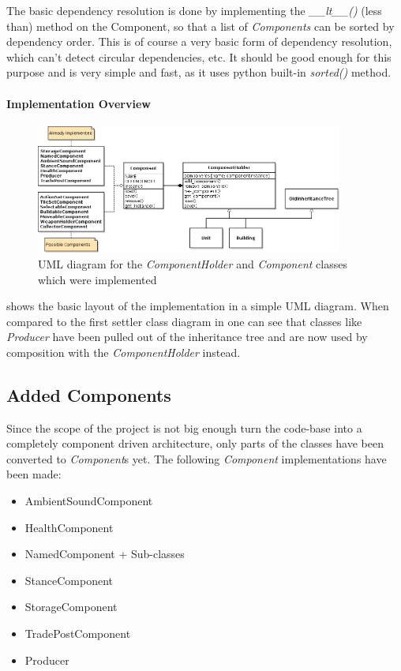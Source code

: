 The basic dependency resolution is done by implementing the \textit{\_\_lt\_\_()} (less than) method on the Component,
so that a list of \textit{Components} can be sorted by dependency order. This is of course a very basic form of
dependency resolution, which can't detect circular dependencies, etc. It should be good enough for this purpose and is very
simple and fast, as it uses python built-in \textit{sorted()} method.

\paragraph{Implementation Overview}
\begin{figure}[H]
\centering
\includegraphics[width=0.9\textwidth]{pics/components_implemented}
\caption{UML diagram for the \textit{ComponentHolder} and \textit{Component} classes which were implemented}
\label{fig:codeimpl}
\end{figure}

 shows the basic layout of the implementation in a simple UML diagram. When compared to the first
settler class diagram in  one can see that classes like \textit{Producer} have been pulled out of the
inheritance tree and are now used by composition with the \textit{ComponentHolder} instead.

\subsection{Added Components}
Since the scope of the project is not big enough turn the \UH{} code-base into a completely component driven
architecture, only parts of the classes have been converted to \textit{Component}s yet. The following \textit{Component}
implementations have been made:
\begin{itemize}
    \item AmbientSoundComponent
    \item HealthComponent
    \item NamedComponent + Sub-classes
    \item StanceComponent
    \item StorageComponent
    \item TradePostComponent
    \item Producer
\end{itemize}

